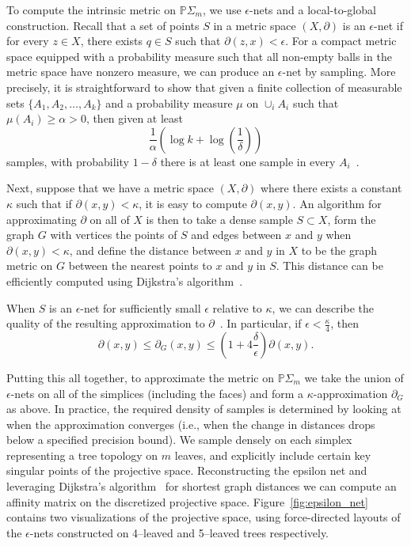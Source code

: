 \documentclass[a4paper,11pt]{article}
\begin{document}
To compute the intrinsic metric on $\mathbb{P}\Sigma_m$, we use $\epsilon$-nets and a local-to-global construction.
Recall that a set of points $S$ in a metric space $(X,\partial)$ is an $\epsilon$-net if for every $z \in X$, there exists $q \in S$ such that $\partial(z,x) < \epsilon$.
For a compact metric space equipped with a probability measure such that all non-empty balls in the metric space have nonzero measure, we can produce an $\epsilon$-net by sampling.
More precisely, it is straightforward to show that given a finite collection of measurable sets $\{A_1, A_2, \ldots, A_k\}$ and a probability measure $\mu$ on $\cup_i A_i$ such that $\mu(A_i) \geq \alpha > 0$, then given at least
\[
\frac{1}{\alpha}\left(\log k + \log(\frac{1}{\delta})\right)
\]
samples, with probability $1-\delta$ there is at least one sample in every $A_i$~\cite[5.1]{niyogi2008finding}.

Next, suppose that we have a metric space $(X,\partial)$ where there exists a constant $\kappa$ such that if $\partial(x,y) < \kappa$, it is easy to compute $\partial(x,y)$.
An algorithm for approximating $\partial$ on all of $X$ is then to take a dense sample $S \subset X$, form the graph $G$ with vertices the points of $S$ and edges between $x$ and $y$ when $\partial(x,y) < \kappa$, and define the distance between $x$ and $y$ in $X$ to be the graph metric on $G$ between the nearest points to $x$ and $y$ in $S$.
This distance can be efficiently computed using Dijkstra's algorithm~\cite{dijkstra1959note}.

When $S$ is an $\epsilon$-net for sufficiently small $\epsilon$ relative to $\kappa$, we can describe the quality of the resulting approximation to $\partial$~\cite[Thm. 2]{bernstein2000graph}.
In particular, if $\epsilon < \frac{\kappa}{4}$, then 
\[
\partial(x,y) \leq \partial_G(x,y) \leq (1 + 4\frac{\delta}{\epsilon}) \partial(x,y).
\]

Putting this all together, to approximate the metric on $\mathbb{P}\Sigma_m$ we take the union of $\epsilon$-nets on all of the simplices (including the faces) and form a $\kappa$-approximation $\partial_G$ as above.
In practice, the required density of samples is determined by looking at when the approximation converges (i.e., when the change in distances drops below a specified precision bound).
We sample densely on each simplex representing a tree topology on $m$ leaves, and explicitly include certain key singular points of the projective space.
Reconstructing the epsilon net and leveraging Dijkstra's algorithm~\cite{dijkstra1959note} for shortest graph distances we can compute an affinity matrix on the discretized projective space.
Figure~\ref{fig:epsilon_net} contains two visualizations of the projective space, using force-directed layouts of the $\epsilon$-nets constructed on 4--leaved and 5--leaved trees respectively.
\end{document}
